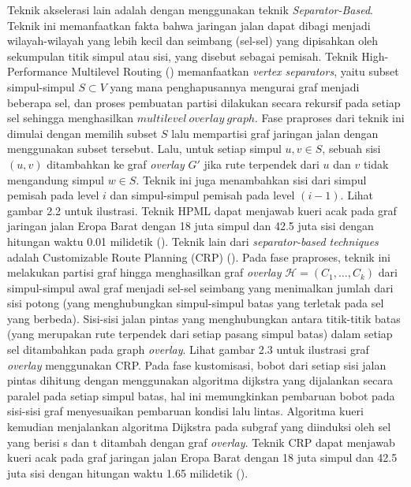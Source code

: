 Teknik akselerasi lain adalah dengan menggunakan teknik \textit{Separator-Based}. Teknik ini memanfaatkan fakta bahwa jaringan jalan dapat dibagi menjadi wilayah-wilayah yang lebih kecil dan seimbang (sel-sel) yang dipisahkan oleh sekumpulan titik simpul atau sisi, yang disebut sebagai pemisah. Teknik High-Performance Multilevel Routing (\cite{DellingHPML}) memanfaatkan \textit{vertex separators}, yaitu subset simpul-simpul $S\subset V$ yang mana penghapusannya mengurai graf menjadi beberapa sel, dan proses pembuatan partisi dilakukan secara rekursif pada setiap sel sehingga menghasilkan $multilevel \ overlay \ graph$. Fase praproses dari teknik ini dimulai dengan memilih subset $S$ lalu mempartisi graf jaringan jalan dengan menggunakan subset tersebut. Lalu, untuk setiap simpul $u,v\in S$, sebuah sisi $(u,v)$ ditambahkan ke graf \textit{overlay} $G'$ jika rute terpendek dari $u$ dan $v$ tidak mengandung simpul $w\in S$. Teknik ini juga menambahkan sisi dari simpul pemisah pada level $i$ dan simpul-simpul pemisah pada level $(i-1)$. Lihat gambar 2.2 untuk ilustrasi. Teknik HPML  dapat menjawab kueri acak pada graf jaringan jalan Eropa Barat dengan 18 juta simpul dan 42.5 juta sisi dengan hitungan waktu 0.01 milidetik (\cite{Bast2015}). Teknik lain dari \textit{separator-based techniques} adalah Customizable Route Planning (CRP) (\cite{Delling2015}). Pada fase praproses, teknik ini melakukan partisi graf hingga menghasilkan graf \textit{overlay} $\mathcal{H}=(C_1,\ldots,C_k)$ dari simpul-simpul awal graf menjadi sel-sel seimbang yang menimalkan jumlah dari sisi potong (yang menghubungkan simpul-simpul batas yang terletak pada sel yang berbeda). Sisi-sisi jalan pintas yang menghubungkan antara titik-titik batas (yang merupakan rute terpendek dari setiap pasang simpul batas) dalam setiap sel ditambahkan pada graph \textit{overlay}. Lihat gambar 2.3 untuk ilustrasi graf \textit{overlay} menggunakan CRP. Pada fase kustomisasi, bobot dari setiap sisi jalan pintas dihitung dengan menggunakan algoritma dijkstra yang dijalankan secara paralel pada setiap simpul batas, hal ini memungkinkan pembaruan bobot pada sisi-sisi graf menyesuaikan pembaruan kondisi lalu lintas. Algoritma kueri kemudian menjalankan algoritma Dijkstra pada subgraf yang diinduksi oleh sel yang berisi s dan t ditambah dengan graf \textit{overlay}. Teknik CRP  dapat menjawab kueri acak pada graf jaringan jalan Eropa Barat dengan 18 juta simpul dan 42.5 juta sisi dengan hitungan waktu 1.65 milidetik (\cite{Delling2015}).


